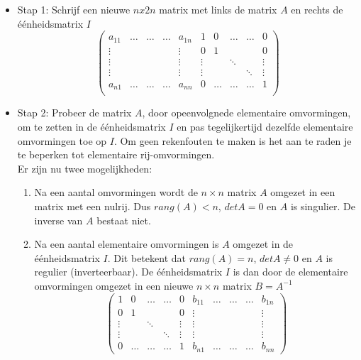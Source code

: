 \begin{itemize}
	\item Stap 1: Schrijf een nieuwe $nx2n$ matrix met links de matrix $A$ en rechts de \'{e}\'{e}nheidsmatrix $I$
	\[ \left( \begin{matrix}
	a_{11} & \ldots & \ldots & \ldots & a_{1n} & 1 & 0 & \ldots & \ldots & 0 \\
	\vdots &  &  &  & \vdots  & 0 & 1 &  &  &  0 \\
	\vdots &  &  &  & \vdots & \vdots &  & \ddots &  & \vdots\\
	\vdots &  &  &  & \vdots & \vdots &  &  & \ddots & \vdots \\
	a_{n1} & \ldots & \ldots & \ldots & a_{nn} & 0 & \ldots & \ldots & \ldots & 1  \\
	\end{matrix} \right) \] 
	\item Stap 2: Probeer de matrix $A$, door opeenvolgnede elementaire omvormingen, om te zetten in de \'{e}\'{e}nheidsmatrix $I$ en pas tegelijkertijd dezelfde elementaire omvormingen toe op $I$. Om geen rekenfouten te maken is het aan te raden je te beperken tot elementaire rij-omvormingen.\\
	Er zijn nu twee mogelijkheden:
	\begin{enumerate}
		\item Na een aantal omvormingen wordt de $n \times n$ matrix $A$ omgezet in een matrix met een nulrij. Dus $rang(A)<n$, $detA=0$ en $A$ is singulier. De inverse van $A$ bestaat niet.
		\item Na een aantal elementaire omvormingen is $A$ omgezet in de \'{e}\'{e}nheidsmatrix $I$. Dit betekent dat $rang(A)=n$, $detA \neq 0$ en $A$ is regulier (inverteerbaar). De \'{e}\'{e}nheidsmatrix $I$ is dan door de elementaire omvormingen omgezet in een nieuwe $n \times n$ matrix $B=A^{-1}$
		\[  \left( \begin{matrix}
		1 & 0 & \ldots & \ldots & 0 & b_{11} & \ldots & \ldots & \ldots & b_{1n} \\
		0 & 1 &  &  &  0 & \vdots & & & & \vdots \\
		\vdots &  & \ddots & & \vdots & \vdots &  &  &  & \vdots \\
		\vdots &  &  & \ddots & \vdots & \vdots & & & & \vdots \\
		0 & \ldots & \ldots & \ldots & 1 & b_{n1} & \ldots & \ldots & \ldots & b_{nn} \end{matrix} \right) 
		\]
	\end{enumerate}
\end{itemize}


